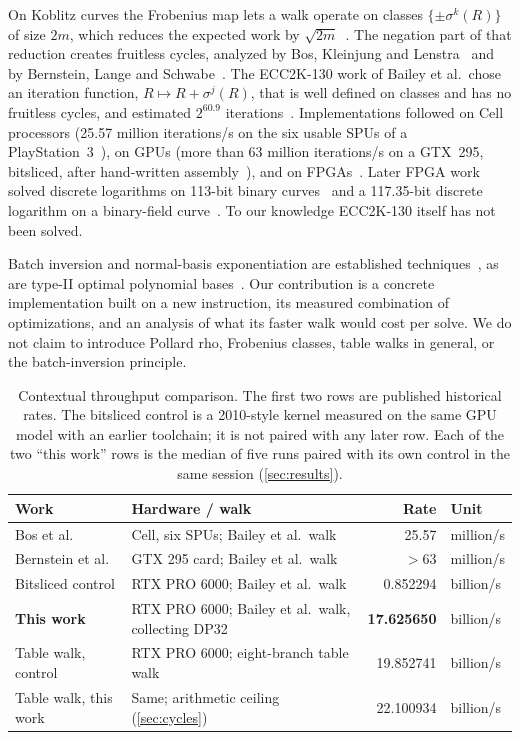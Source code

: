 \documentclass[11pt,a4paper]{article}
\begin{document}
On Koblitz curves the Frobenius map lets a walk operate on classes $\{\pm\sigma^k(R)\}$ of size $2m$, which reduces the expected work by $\sqrt{2m}$~\cite{wiener1998,glv2000}. The negation part of that reduction creates fruitless cycles, analyzed by Bos, Kleinjung and Lenstra~\cite{bkl2010} and by Bernstein, Lange and Schwabe~\cite{negation2011}. The ECC2K-130 work of Bailey et al.\ chose an iteration function, $R\mapsto R+\sigma^j(R)$, that is well defined on classes and has no fruitless cycles, and estimated $2^{60.9}$ iterations~\cite{bailey2009}. Implementations followed on Cell processors (25.57 million iterations/s on the six usable SPUs of a PlayStation~3~\cite{bos2010}), on GPUs (more than 63 million iterations/s on a GTX~295, bitsliced, after hand-written assembly~\cite{bernstein2012,bernstein2012asm}), and on FPGAs~\cite{fan2010}. Later FPGA work solved discrete logarithms on 113-bit binary curves~\cite{wenger2014,wenger2016} and a 117.35-bit discrete logarithm on a binary-field curve~\cite{bernstein2016fpga}. To our knowledge ECC2K-130 itself has not been solved.

Batch inversion and normal-basis exponentiation are established techniques~\cite{montgomery1987,itoh1988}, as are type-II optimal polynomial bases~\cite{bernstein2010opb}. Our contribution is a concrete implementation built on a new instruction, its measured combination of optimizations, and an analysis of what its faster walk would cost per solve. We do not claim to introduce Pollard rho, Frobenius classes, table walks in general, or the batch-inversion principle.

\begin{table}[t]
\centering\small
\begin{tabularx}{\linewidth}{@{}lYrl@{}}
\toprule
Work & Hardware / walk & Rate & Unit\\
\midrule
Bos et al.~\cite{bos2010} & Cell, six SPUs; Bailey et al.\ walk & 25.57 & million/s\\
Bernstein et al.~\cite{bernstein2012} & GTX 295 card; Bailey et al.\ walk & $>63$ & million/s\\
Bitsliced control & RTX PRO 6000; Bailey et al.\ walk & 0.852294 & billion/s\\
\textbf{This work} & RTX PRO 6000; Bailey et al.\ walk, collecting DP32 & \textbf{17.625650} & billion/s\\
Table walk, control & RTX PRO 6000; eight-branch table walk & 19.852741 & billion/s\\
Table walk, this work & Same; arithmetic ceiling (\cref{sec:cycles}) & 22.100934 & billion/s\\
\bottomrule
\end{tabularx}
\caption{Contextual throughput comparison. The first two rows are published historical rates. The bitsliced control is a 2010-style kernel measured on the same GPU model with an earlier toolchain; it is not paired with any later row. Each of the two ``this work'' rows is the median of five runs paired with its own control in the same session (\cref{sec:results}).}
\label{tab:context}
\end{table}
\end{document}
